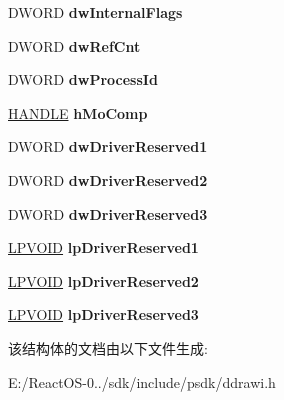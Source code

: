 \begin{DoxyCompactItemize}
D\+W\+O\+RD {\bfseries dw\+Internal\+Flags}
\item 
\mbox{\label{struct___d_d_r_a_w_i___d_d_m_o_t_i_o_n_c_o_m_p___l_c_l_a7218b3dde59b86deecb6687f08b35281}} 
D\+W\+O\+RD {\bfseries dw\+Ref\+Cnt}
\item 
\mbox{\label{struct___d_d_r_a_w_i___d_d_m_o_t_i_o_n_c_o_m_p___l_c_l_a7bc89822dd9b61461c6dd98bb4c20fed}} 
D\+W\+O\+RD {\bfseries dw\+Process\+Id}
\item 
\mbox{\label{struct___d_d_r_a_w_i___d_d_m_o_t_i_o_n_c_o_m_p___l_c_l_a46093ad83c8b1f5612995588df044cc5}} 
\hyperlink{interfacevoid}{H\+A\+N\+D\+LE} {\bfseries h\+Mo\+Comp}
\item 
\mbox{\label{struct___d_d_r_a_w_i___d_d_m_o_t_i_o_n_c_o_m_p___l_c_l_a2e8e73d9c4b951362ef3900df212f484}} 
D\+W\+O\+RD {\bfseries dw\+Driver\+Reserved1}
\item 
\mbox{\label{struct___d_d_r_a_w_i___d_d_m_o_t_i_o_n_c_o_m_p___l_c_l_ae5a8baf1012a50560e5ea346ebf1c0cb}} 
D\+W\+O\+RD {\bfseries dw\+Driver\+Reserved2}
\item 
\mbox{\label{struct___d_d_r_a_w_i___d_d_m_o_t_i_o_n_c_o_m_p___l_c_l_af391fff606df8631d4d1da9324c66de3}} 
D\+W\+O\+RD {\bfseries dw\+Driver\+Reserved3}
\item 
\mbox{\label{struct___d_d_r_a_w_i___d_d_m_o_t_i_o_n_c_o_m_p___l_c_l_ace968f171403a1aaa8c334ed6c6b1aff}} 
\hyperlink{interfacevoid}{L\+P\+V\+O\+ID} {\bfseries lp\+Driver\+Reserved1}
\item 
\mbox{\label{struct___d_d_r_a_w_i___d_d_m_o_t_i_o_n_c_o_m_p___l_c_l_af793dd33e4605670ebebab20abb8739d}} 
\hyperlink{interfacevoid}{L\+P\+V\+O\+ID} {\bfseries lp\+Driver\+Reserved2}
\item 
\mbox{\label{struct___d_d_r_a_w_i___d_d_m_o_t_i_o_n_c_o_m_p___l_c_l_a7d113497afcbaea6b1bc5cc9c23f54ee}} 
\hyperlink{interfacevoid}{L\+P\+V\+O\+ID} {\bfseries lp\+Driver\+Reserved3}
\end{DoxyCompactItemize}


该结构体的文档由以下文件生成\+:\begin{DoxyCompactItemize}
\item 
E\+:/\+React\+O\+S-\/0../sdk/include/psdk/ddrawi.\+h\end{DoxyCompactItemize}
